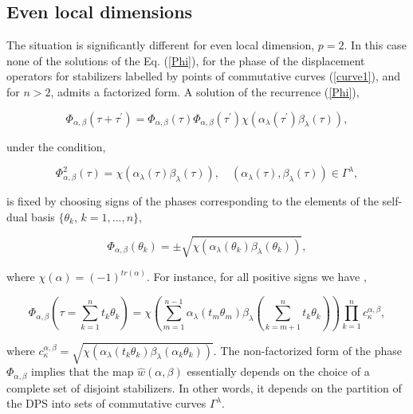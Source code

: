 \documentclass[quantumrep,article,submit,pdftex,moreauthors]{Definitions/mdpi}
\begin{document}
\subsection{Even local dimensions}

The situation is significantly different for even local dimension, $p=2$. In
this case none of the solutions of the Eq. (\ref{Phi}), for the phase of the
displacement operators for stabilizers labelled by points of commutative curves
(\ref{curve1}), and for $n > 2$, admits a factorized form. A solution of the
recurrence (\ref{Phi}),

\begin{equation}
  \Phi_{\alpha,\beta}\left(\tau + \tau^{\prime}\right)
  = \Phi_{\alpha,\beta}(\tau) \Phi_{\alpha,\beta }(\tau^{\prime})
  \chi\left( \alpha_{\lambda }(\tau^{\prime}) \beta_{\lambda}(\tau) \right),
  \label{phase 2}
\end{equation}

under the condition,

\begin{equation*}
  \Phi_{\alpha,\beta}^{2}(\tau)
  = \chi \left( \alpha_{\lambda}(\tau) \beta_{\lambda}(\tau ) \right),
  \quad \left(\alpha_{\lambda}(\tau), \beta_{\lambda}(\tau)\right)
  \in \Gamma^{\lambda},
\end{equation*}

is fixed by choosing signs of the phases corresponding to the elements of the
self-dual basis $\{\theta _{k}$, $k=1,...,n\}$,

\begin{equation}
  \Phi_{\alpha ,\beta }(\theta _{k})=\pm \sqrt{\chi \left( \alpha_{\lambda
  }(\theta_{k})\beta_{\lambda }(\theta _{k})\right) },
  \label{Phib}
\end{equation}

where $\chi(\alpha) = (-1)^{tr(\alpha)}$. For instance, for all positive signs
we have \cite{klimov06},

\begin{equation}
  \Phi_{\alpha,\beta}\left(
    \tau = \sum\limits_{k=1}^{n}t_{k}\theta_{k}
  \right)
  = \chi\left(
    \sum\limits_{m=1}^{n-1} \alpha_{\lambda}(t_{m}\theta _{m})\beta_{\lambda}
    \left( \sum\limits_{k=m+1}^{n} t_{k} \theta_{k} \right)
  \right)
  \prod\limits_{k=1}^{n}c_{\kappa }^{\alpha ,\beta },
  \label{Phi G}
\end{equation}

where $c_{\kappa }^{\alpha ,\beta }=\sqrt{\chi \left( \alpha _{\lambda
}(t_{k}\theta _{k})\beta _{\lambda }\left( \alpha _{k}\theta _{k}\right) \right)
}$. The non-factorized form of the phase $\Phi _{\alpha ,\beta }$ implies that
the map $\hat{w}(\alpha ,\beta )$ essentially depends on the choice of a
complete set of disjoint stabilizers. In other words, it depends on the
partition of the DPS into sets of commutative curves $\Gamma ^{\lambda }$.
\end{document}
